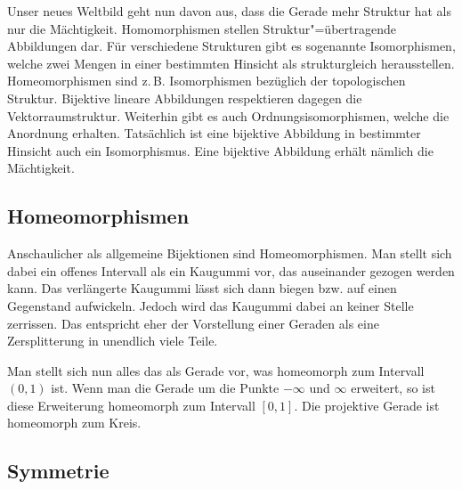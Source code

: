 \documentclass[a4paper,11pt,fleqn,twocolumn,twoside]{article}
\begin{document}
Unser neues Weltbild geht nun davon aus, dass die Gerade mehr
Struktur hat als nur die Mächtigkeit. Homomorphismen stellen
Struktur"=übertragende Abbildungen dar. Für verschiedene Strukturen
gibt es sogenannte Isomorphismen, welche zwei Mengen in einer
bestimmten Hinsicht als strukturgleich herausstellen. Homeomorphismen
sind z.\,B. Isomorphismen bezüglich der topologischen Struktur.
Bijektive lineare Abbildungen respektieren dagegen die
Vektorraumstruktur. Weiterhin gibt es auch Ordnungsisomorphismen,
welche die Anordnung erhalten. Tatsächlich ist eine bijektive
Abbildung in bestimmter Hinsicht auch ein Isomorphismus.
Eine bijektive Abbildung erhält nämlich die Mächtigkeit.


\subsection{Homeomorphismen}

Anschaulicher als allgemeine Bijektionen sind Homeomorphismen. Man
stellt sich dabei ein offenes Intervall als ein Kaugummi vor, das
auseinander gezogen werden kann. Das verlängerte Kaugummi lässt sich
dann biegen bzw. auf einen Gegenstand aufwickeln. Jedoch wird das
Kaugummi dabei an keiner Stelle zerrissen. Das entspricht eher der
Vorstellung einer Geraden als eine Zersplitterung in unendlich
viele Teile.

Man stellt sich nun alles das als Gerade vor, was homeomorph zum
Intervall $(0,1)$ ist. Wenn man die Gerade um die Punkte
$-\infty$ und $\infty$ erweitert, so ist diese Erweiterung
homeomorph zum Intervall $[0,1]$. Die projektive Gerade ist
homeomorph zum Kreis.

\subsection{Symmetrie}
\end{document}
